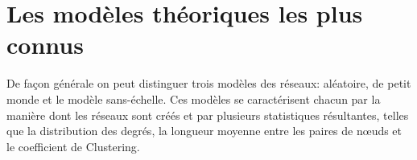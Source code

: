 \section{Les modèles théoriques les plus connus} 

De façon générale on peut distinguer trois modèles des réseaux: aléatoire, de petit monde et le modèle sans-échelle. Ces modèles se caractérisent chacun par la manière dont les réseaux sont créés et par plusieurs statistiques résultantes, telles que la distribution des degrés, la longueur moyenne entre les paires de nœuds et le coefficient de Clustering.
